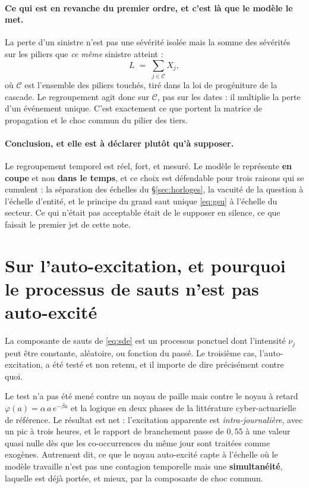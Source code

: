 \documentclass[11pt,a4paper]{article}
\begin{document}
\paragraph{Ce qui est en revanche du premier ordre, et c'est là que le modèle le met.} La
perte d'un sinistre n'est pas une sévérité isolée mais la somme des sévérités sur les
piliers que \emph{ce même} sinistre atteint :
\begin{equation}
\label{eq:perte-incident}
  L \;=\; \sum_{j \in \mathcal C} X_j ,
\end{equation}
où $\mathcal C$ est l'ensemble des piliers touchés, tiré dans la loi de progéniture de la
cascade. Le regroupement agit donc sur $\mathcal C$, pas sur les dates : il multiplie la
perte d'un événement unique. C'est exactement ce que portent la matrice de propagation et le
choc commun du pilier des tiers.

\paragraph{Conclusion, et elle est à déclarer plutôt qu'à supposer.} Le regroupement
temporel est réel, fort, et mesuré. Le modèle le représente \textbf{en coupe} et non
\textbf{dans le temps}, et ce choix est défendable pour trois raisons qui se cumulent : la
séparation des échelles du \S\ref{sec:horloges}, la vacuité de la question à l'échelle
d'entité, et le principe du grand saut unique \eqref{eq:gsu} à l'échelle du secteur. Ce qui
n'était pas acceptable était de le supposer en silence, ce que faisait le premier jet de
cette note.

\section{Sur l'auto-excitation, et pourquoi le processus de sauts n'est pas auto-excité}

La composante de sauts de \eqref{eq:sde} est un processus ponctuel dont l'intensité $\nu_j$
peut être constante, aléatoire, ou fonction du passé. Le troisième cas, l'auto-excitation,
a été testé et non retenu, et il importe de dire précisément contre quoi.

Le test n'a pas été mené contre un noyau de paille mais contre le noyau à retard
$\varphi(a) = \alpha\,a\,e^{-\beta a}$ et la logique en deux phases de la littérature
cyber-actuarielle de référence. Le résultat est net : l'excitation apparente est
\emph{intra-journalière}, avec un pic à trois heures, et le rapport de branchement passe de
$0{,}55$ à une valeur quasi nulle dès que les co-occurrences du même jour sont traitées
comme exogènes. Autrement dit, ce que le noyau auto-excité capte à l'échelle où le modèle
travaille n'est pas une contagion temporelle mais une \textbf{simultanéité}, laquelle est
déjà portée, et mieux, par la composante de choc commun.
\end{document}
